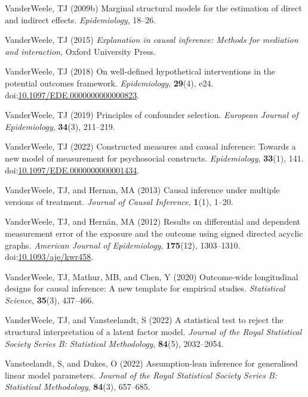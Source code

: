 \documentclass[
  single column]{article}
\newlength{\cslhangindent}
\newenvironment{CSLReferences}[2] %
 {\begin{list}{}{%
  \setlength{\itemindent}{0pt}
  \setlength{\leftmargin}{0pt}
  \setlength{\parsep}{0pt}
  \ifodd #1
   \setlength{\leftmargin}{\cslhangindent}
   \setlength{\itemindent}{-1\cslhangindent}
  \fi
  \setlength{\itemsep}{#2\baselineskip}}}
 {\end{list}}
\begin{document}
\begin{CSLReferences}{1}{0}
VanderWeele, TJ (2009b) Marginal structural models for the estimation of
direct and indirect effects. \emph{Epidemiology}, 18--26.

VanderWeele, TJ (2015) \emph{Explanation in causal inference: Methods
for mediation and interaction}, Oxford University Press.

VanderWeele, TJ (2018) On well-defined hypothetical interventions in the
potential outcomes framework. \emph{Epidemiology}, \textbf{29}(4), e24.
doi:\href{https://doi.org/10.1097/EDE.0000000000000823}{10.1097/EDE.0000000000000823}.

VanderWeele, TJ (2019) Principles of confounder selection.
\emph{European Journal of Epidemiology}, \textbf{34}(3), 211--219.

VanderWeele, TJ (2022) Constructed measures and causal inference:
Towards a new model of measurement for psychosocial constructs.
\emph{Epidemiology}, \textbf{33}(1), 141.
doi:\href{https://doi.org/10.1097/EDE.0000000000001434}{10.1097/EDE.0000000000001434}.

VanderWeele, TJ, and Hernan, MA (2013) Causal inference under multiple
versions of treatment. \emph{Journal of Causal Inference},
\textbf{1}(1), 1--20.

VanderWeele, TJ, and Hernán, MA (2012) Results on differential and
dependent measurement error of the exposure and the outcome using signed
directed acyclic graphs. \emph{American Journal of Epidemiology},
\textbf{175}(12), 1303--1310.
doi:\href{https://doi.org/10.1093/aje/kwr458}{10.1093/aje/kwr458}.

VanderWeele, TJ, Mathur, MB, and Chen, Y (2020) Outcome-wide
longitudinal designs for causal inference: A new template for empirical
studies. \emph{Statistical Science}, \textbf{35}(3), 437--466.

VanderWeele, TJ, and Vansteelandt, S (2022) A statistical test to reject
the structural interpretation of a latent factor model. \emph{Journal of
the Royal Statistical Society Series B: Statistical Methodology},
\textbf{84}(5), 2032--2054.

Vansteelandt, S, and Dukes, O (2022) Assumption-lean inference for
generalised linear model parameters. \emph{Journal of the Royal
Statistical Society Series B: Statistical Methodology}, \textbf{84}(3),
657--685.


\end{CSLReferences}
\end{document}
